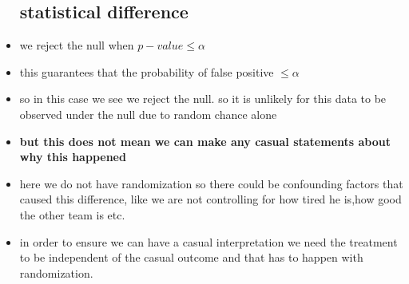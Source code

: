 \documentclass{article}
\begin{document}
\begin{itemize}
\subsection{statistical difference }
\item we reject the null when $p-value\leq \alpha$
\item this guarantees that the probability of false positive $\leq \alpha$
\item so in this case we see we reject the null. so it is unlikely for this data to be observed under the null due to random chance alone 
\item \textbf{but this does not mean we can make any casual statements about why this happened }
\item here we do not have randomization so there could be confounding factors that caused this difference, like we are not controlling for how tired he is,how good the other team is etc. 
\item in order to ensure we can have a casual interpretation we need the treatment to be independent of the casual outcome and that has to happen with randomization. 
\end{itemize}
\end{document}
